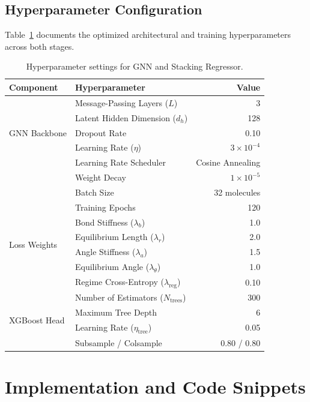 \documentclass[10pt,journal,compsoc]{IEEEtran}
\begin{document}
\subsection{Hyperparameter Configuration}
Table~\ref{tab:hyperparams} documents the optimized architectural and training hyperparameters across both stages.

\begin{table}[h]
\centering
\caption{Hyperparameter settings for GNN and Stacking Regressor.}
\label{tab:hyperparams}
\begin{tabular}{llr}
\toprule
\textbf{Component} & \textbf{Hyperparameter} & \textbf{Value} \\
\midrule
\multirow{5}{*}{GNN Backbone} & Message-Passing Layers ($L$) & 3 \\
 & Latent Hidden Dimension ($d_h$) & 128 \\
 & Dropout Rate & 0.10 \\
 & Learning Rate ($\eta$) & $3 \times 10^{-4}$ \\
 & Learning Rate Scheduler & Cosine Annealing \\
 & Weight Decay & $1 \times 10^{-5}$ \\
 & Batch Size & 32 molecules \\
 & Training Epochs & 120 \\
\midrule
\multirow{4}{*}{Loss Weights} & Bond Stiffness ($\lambda_b$) & 1.0 \\
 & Equilibrium Length ($\lambda_r$) & 2.0 \\
 & Angle Stiffness ($\lambda_a$) & 1.5 \\
 & Equilibrium Angle ($\lambda_\theta$) & 1.0 \\
 & Regime Cross-Entropy ($\lambda_{\text{reg}}$) & 0.10 \\
\midrule
\multirow{4}{*}{XGBoost Head} & Number of Estimators ($N_{\text{trees}}$) & 300 \\
 & Maximum Tree Depth & 6 \\
 & Learning Rate ($\eta_{\text{tree}}$) & 0.05 \\
 & Subsample / Colsample & 0.80 / 0.80 \\
\bottomrule
\end{tabular}
\end{table}

\section{Implementation and Code Snippets}
\label{sec:implementation}
\end{document}
